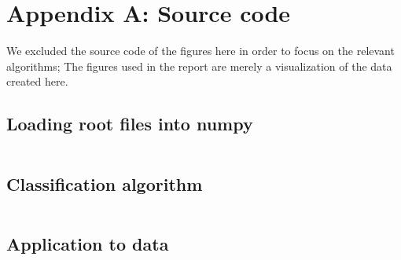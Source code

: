 \section{Appendix A: Source code}
We excluded the source code of the figures here in order to focus on the relevant algorithms; 
The figures used in the report are merely a visualization of the data created here.
\subsection{Loading root files into numpy}
\label{sub:loading_root_into_numpy}
\inputminted{python}{analysis/IO.py}    
\subsection{Classification algorithm}
\label{sub:cut.py}
\inputminted{python}{analysis/cut.py}    
\subsection{Application to data}
\label{sub:application_to_data}
\inputminted{python}{analysis/data_all_gev.py}    
